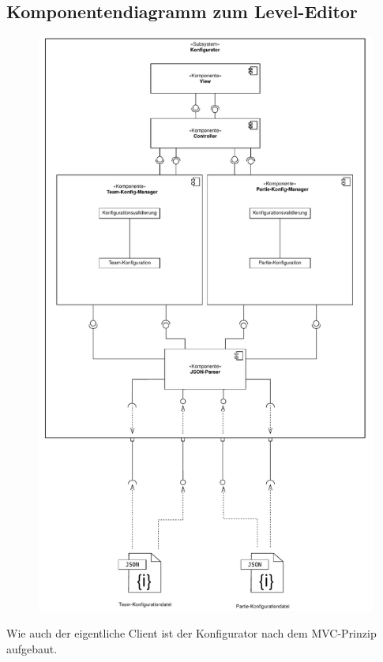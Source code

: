 \subsection{Komponentendiagramm zum Level-Editor}
\begin{figure}[H]
    \centering
    \includegraphics[scale=0.5]{../Meilenstein05/images/Konfigurator.pdf}
\end{figure}
Wie auch der eigentliche Client ist der Konfigurator nach dem MVC-Prinzip aufgebaut.
